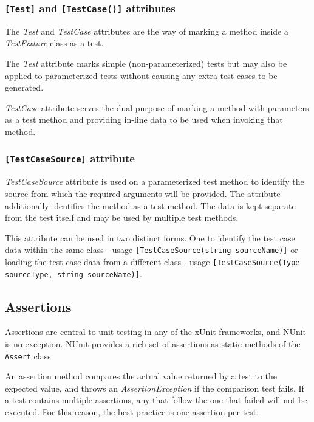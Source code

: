 \documentclass[
  print,
  table,
  nolof,
  nolot,
  nocover,
  oneside
]{fithesis3}
\begin{document}
\subsubsection{\texttt{[Test]} and \texttt{[TestCase()]} attributes}
The \textit{Test} and \textit{TestCase} attributes are the way of marking a method inside a \textit{TestFixture} class as a test.

The \textit{Test} attribute marks simple (non-parameterized) tests but may also be applied to parameterized tests without causing any extra test cases to be generated.

\textit{TestCase} attribute serves the dual purpose of marking a method with parameters as a test method and providing in-line data to be used when invoking that method.

\subsubsection{\texttt{[TestCaseSource]} attribute}
\textit{TestCaseSource} attribute is used on a parameterized test method to identify the source from which the required arguments will be provided. The attribute additionally identifies the method as a test method. The data is kept separate from the test itself and may be used by multiple test methods.

This attribute can be used in two distinct forms. One to identify the test case data within the same class - usage \texttt{[TestCaseSource(string sourceName)]} or loading the test case data from a different class - usage \texttt{[TestCaseSource(Type sourceType, string sourceName)]}\parencite{nunit_docs}.

\subsection{Assertions}
\label{assertions}

Assertions are central to unit testing in any of the xUnit frameworks, and NUnit is no exception. NUnit provides a rich set of assertions as static methods of the \texttt{Assert} class.

An assertion method compares the actual value returned by a test to the expected value, and throws an \textit{AssertionException} if the comparison test fails\parencite{assertions}. If a test contains multiple assertions, any that follow the one that failed will not be executed. For this reason, the best practice is one assertion per test.
\end{document}
